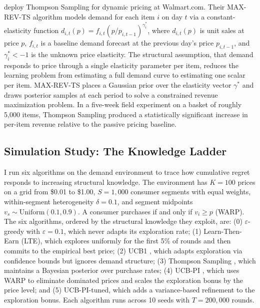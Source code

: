 \citet{Ganti2018} deploy Thompson Sampling for dynamic pricing at Walmart.com. Their MAX-REV-TS algorithm models demand for each item $i$ on day $t$ via a constant-elasticity function $d_{i,t}(p) = f_{i,t}(p/p_{i,t-1})^{\gamma_i^*}$, where $d_{i,t}(p)$ is unit sales at price $p$, $f_{i,t}$ is a baseline demand forecast at the previous day's price $p_{i,t-1}$, and $\gamma_i^* < -1$ is the unknown price elasticity. The structural assumption, that demand responds to price through a single elasticity parameter per item, reduces the learning problem from estimating a full demand curve to estimating one scalar per item. MAX-REV-TS places a Gaussian prior over the elasticity vector $\gamma^*$ and draws posterior samples at each period to solve a constrained revenue maximization problem. In a five-week field experiment on a basket of roughly 5,000 items, Thompson Sampling produced a statistically significant increase in per-item revenue relative to the passive pricing baseline.

\subsection{Simulation Study: The Knowledge Ladder}
\label{sec:bandit_sim}

I run six algorithms on the \citet{Misra2019} demand environment to trace how cumulative regret responds to increasing structural knowledge. The environment has $K = 100$ prices on a grid from \$0.01 to \$1.00, $S = 1{,}000$ consumer segments with equal weights, within-segment heterogeneity $\delta = 0.1$, and segment midpoints $v_s \sim \mathrm{Uniform}(0.1, 0.9)$. A consumer purchases if and only if $v_i \geq p$ (WARP). The six algorithms, ordered by the structural knowledge they exploit, are: (0) $\varepsilon$-greedy with $\varepsilon = 0.1$, which never adapts its exploration rate; (1) Learn-Then-Earn (LTE), which explores uniformly for the first 5\% of rounds and then commits to the empirical best price; (2) UCB1 \citep{auer2002}, which adapts exploration via confidence bounds but ignores demand structure; (3) Thompson Sampling \citep{Thompson1933}, which maintains a Bayesian posterior over purchase rates; (4) UCB-PI \citep{Misra2019}, which uses WARP to eliminate dominated prices and scales the exploration bonus by the price level; and (5) UCB-PI-tuned, which adds a variance-based refinement to the exploration bonus. Each algorithm runs across 10 seeds with $T = 200{,}000$ rounds.

